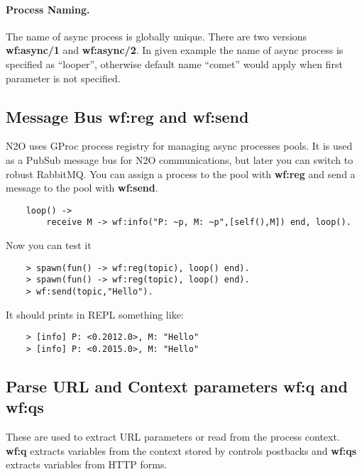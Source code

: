 \paragraph{\bf Process Naming.} The name of async process is globally unique. There are two
versions {\bf wf:async/1} and {\bf wf:async/2}. In given example
the name of async process is specified as ``looper'', otherwise default name
``comet'' would apply when first parameter is not specified.

\subsection{Message Bus {\bf wf:reg} and {\bf wf:send}}
N2O uses GProc process registry for managing async processes pools.
It is used as a PubSub message bus for N2O communications, but later you can switch to robust RabbitMQ.
You can assign a process to the pool with {\bf wf:reg} and send a message to the pool with {\bf wf:send}.

\vspace{1\baselineskip}
\begin{lstlisting}
    loop() ->
        receive M -> wf:info("P: ~p, M: ~p",[self(),M]) end, loop().
\end{lstlisting}

Now you can test it

\begin{lstlisting}
    > spawn(fun() -> wf:reg(topic), loop() end).
    > spawn(fun() -> wf:reg(topic), loop() end).
    > wf:send(topic,"Hello").
\end{lstlisting}

It should prints in REPL something like:

\begin{lstlisting}
    > [info] P: <0.2012.0>, M: "Hello"
    > [info] P: <0.2015.0>, M: "Hello"
\end{lstlisting}

\subsection{Parse URL and Context parameters {\bf wf:q} and {\bf wf:qs}}
These are used to extract URL parameters or read from the process context. {\bf wf:q} extracts variables
from the context stored by controls postbacks and {\bf wf:qs} extracts variables from HTTP forms.

\subsection{Render {\bf wf:render}}
Renders elements or actions with common render.

